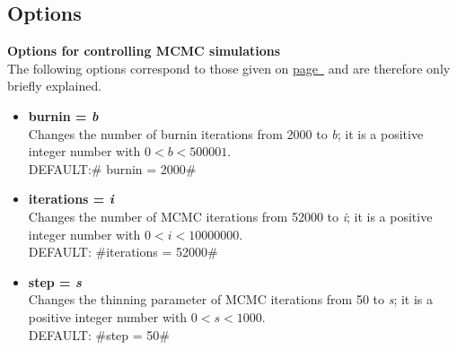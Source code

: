 \subsection{Options}

{\bf Options for controlling MCMC simulations} \\[0.2cm]
The following options correspond to those given on
\hyperref[mcmc_options]{page~\pageref*{mcmc_options}} and are
therefore only briefly explained.
\begin{itemize}
\item {\bf burnin = {\em b} } \\
Changes the number of burnin iterations from 2000 to {\em b}; it is a positive integer number with $0<b<500001$.\\
DEFAULT:# burnin = 2000#
\item {\bf iterations = {\em i} } \\
Changes the number of MCMC iterations from 52000 to {\em i}; it is a positive integer number with $0< i<10000000$.\\
DEFAULT: #iterations = 52000#
\item {\bf step = {\em s}} \\
Changes the thinning parameter of MCMC iterations from 50 to {\em s}; it is a positive integer number with $0<s<1000$.\\
DEFAULT: #step = 50#
\end{itemize}

\vspace{1cm}

